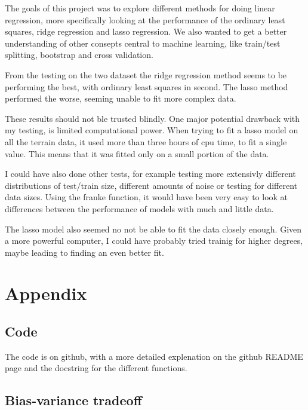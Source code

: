 \documentclass[12pt]{article}
\begin{document}
The goals of this project was to explore different methods for doing linear regression, more specifically looking at the performance of the ordinary least squares, ridge regression and lasso regression.
We also wanted to get a better understanding of other consepts central to machine learning, like train/test splitting, bootstrap and cross validation.

From the testing on the two dataset the ridge regression method seems to be performing the best, with ordinary least squares in second.
The lasso method performed the worse, seeming unable to fit more complex data. 

These results should not ble trusted blindly.
One major potential drawback with my testing, is limited computational power.
When trying to fit a lasso model on all the terrain data, it used more than three hours of cpu time, to fit a single value.
This means that it was fitted only on a small portion of the data.

I could have also done other tests, for example testing more extensivly different distributions of test/train size, different amounts of noise or testing for different data sizes.
Using the franke function, it would have been very easy to look at differences between the performance of models with much and little data.

The lasso model also seemed no not be able to fit the data closely enough.
Given a more powerful computer, I could have probably tried trainig for higher degrees, maybe leading to finding an even better fit.






\section{Appendix}

\subsection{Code}

The code is on github, with a more detailed explenation on the github README page and the docstring for the different functions.

\subsection{Bias-variance tradeoff}
\end{document}

